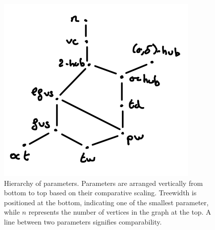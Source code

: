 \begin{figure}
    \centering
    \includegraphics[width=.4\textwidth]{figures/hierarchy.png}
    \caption{Hierarchy of parameters. Parameters are arranged vertically from bottom to top based on their comparative scaling. Treewidth is positioned at the bottom, indicating one of the smallest parameter, while $n$ represents the number of vertices in the graph at the top. A line between two parameters signifies comparability.}
    \label{fig:hierarchy}
\end{figure}